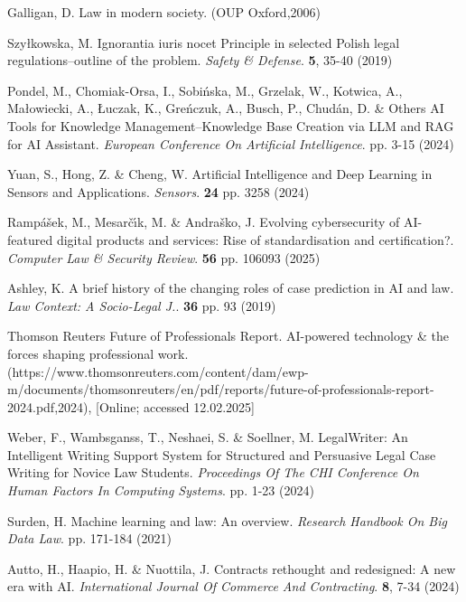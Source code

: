 \documentclass[preprint,12pt,number]{elsarticle}
\begin{document}
%
\begin{thebibliography}{00}
Galligan, D. Law in modern society. (OUP Oxford,2006)

Szyłkowska, M. Ignorantia iuris nocet Principle in selected Polish legal regulations–outline of the problem. {\em Safety \& Defense}. \textbf{5}, 35-40 (2019)

Pondel, M., Chomiak-Orsa, I., Sobińska, M., Grzelak, W., Kotwica, A., Małowiecki, A., Łuczak, K., Greńczuk, A., Busch, P., Chudán, D. \& Others AI Tools for Knowledge Management–Knowledge Base Creation via LLM and RAG for AI Assistant. {\em European Conference On Artificial Intelligence}. pp. 3-15 (2024)

Yuan, S., Hong, Z. \& Cheng, W. Artificial Intelligence and Deep Learning in Sensors and Applications. {\em Sensors}. \textbf{24} pp. 3258 (2024)

Ramp{\'a}{\v{s}}ek, M., Mesar{\v{c}}{\'\i}k, M. \& Andra{\v{s}}ko, J. Evolving cybersecurity of AI-featured digital products and services: Rise of standardisation and certification?. {\em Computer Law \& Security Review}. \textbf{56} pp. 106093 (2025)

Ashley, K. A brief history of the changing roles of case prediction in AI and law. {\em Law Context: A Socio-Legal J.}. \textbf{36} pp. 93 (2019)

Thomson Reuters Future of Professionals Report. AI-powered technology \& the forces shaping professional work. (https://www.thomsonreuters.com/content/dam/ewp-m/documents/thomsonreuters/en/pdf/reports/future-of-professionals-report-2024.pdf,2024), [Online; accessed 12.02.2025]

Weber, F., Wambsganss, T., Neshaei, S. \& Soellner, M. LegalWriter: An Intelligent Writing Support System for Structured and Persuasive Legal Case Writing for Novice Law Students. {\em Proceedings Of The CHI Conference On Human Factors In Computing Systems}. pp. 1-23 (2024)

Surden, H. Machine learning and law: An overview. {\em Research Handbook On Big Data Law}. pp. 171-184 (2021)

Autto, H., Haapio, H. \& Nuottila, J. Contracts rethought and redesigned: A new era with AI. {\em International Journal Of Commerce And Contracting}. \textbf{8}, 7-34 (2024)


\end{thebibliography}
\end{document}

